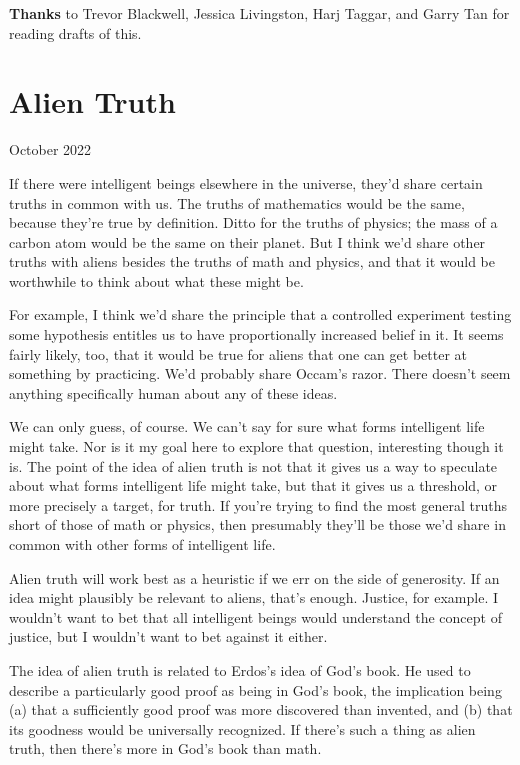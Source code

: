 \documentclass[12pt]{book}
\begin{document}
\textbf{Thanks} to Trevor Blackwell, Jessica Livingston, Harj Taggar,
and Garry Tan for reading drafts of this.
\chapter{Alien Truth}

October 2022

If there were intelligent beings elsewhere in the universe, they'd share
certain truths in common with us. The truths of mathematics would be the
same, because they're true by definition. Ditto for the truths of
physics; the mass of a carbon atom would be the same on their planet.
But I think we'd share other truths with aliens besides the truths of
math and physics, and that it would be worthwhile to think about what
these might be.

For example, I think we'd share the principle that a controlled
experiment testing some hypothesis entitles us to have proportionally
increased belief in it. It seems fairly likely, too, that it would be
true for aliens that one can get better at something by practicing. We'd
probably share Occam's razor. There doesn't seem anything specifically
human about any of these ideas.

We can only guess, of course. We can't say for sure what forms
intelligent life might take. Nor is it my goal here to explore that
question, interesting though it is. The point of the idea of alien truth
is not that it gives us a way to speculate about what forms intelligent
life might take, but that it gives us a threshold, or more precisely a
target, for truth. If you're trying to find the most general truths
short of those of math or physics, then presumably they'll be those we'd
share in common with other forms of intelligent life.

Alien truth will work best as a heuristic if we err on the side of
generosity. If an idea might plausibly be relevant to aliens, that's
enough. Justice, for example. I wouldn't want to bet that all
intelligent beings would understand the concept of justice, but I
wouldn't want to bet against it either.

The idea of alien truth is related to Erdos's idea of God's book. He
used to describe a particularly good proof as being in God's book, the
implication being (a) that a sufficiently good proof was more discovered
than invented, and (b) that its goodness would be universally
recognized. If there's such a thing as alien truth, then there's more in
God's book than math.
\end{document}
